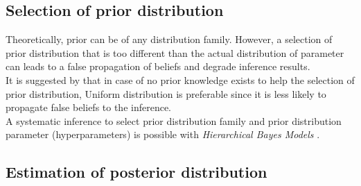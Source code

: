 \subsection{Selection of prior distribution}
Theoretically, prior can be of any distribution family. However, a selection of
prior distribution that is too different than the actual distribution of
parameter can leads to a false propagation of beliefs and degrade inference
results.\\
It is suggested by \cite{polgreen2016data} that in case of no prior knowledge
exists to help the selection of prior distribution, Uniform distribution is
preferable since it is less likely to propagate false beliefs to the
inference.\\
A systematic inference to select prior distribution family and prior
distribution parameter (hyperparameters) is possible with \textit{Hierarchical Bayes Models} \cite{allenby2005hierarchical}.

\subsection{Estimation of posterior distribution}
